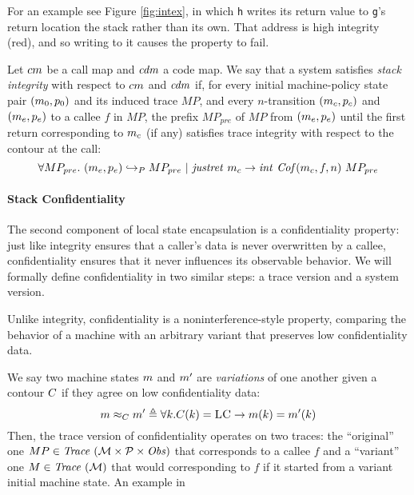 \documentclass[acmsmall,review,anonymous]{acmart}\settopmatter{printfolios=true,printccs=false,printacmref=false}
\begin{document}
For an example see Figure \ref{fig:intex}, in which {\tt h} writes its return
value to {\tt g}'s return location the stack rather than its own. That address
is high integrity (red), and so writing to it causes the property to fail.

Let $cm$ be a call map and $\mathit{cdm}$ a code map. We say that a
system satisfies {\em stack integrity} with respect to $cm$ and
$\mathit{cdm}$ if, for every initial machine-policy state pair $(m_0,
p_0)$ and its induced trace $MP$, and every $n$-transition
$(m_c, p_c)$ and $(m_e, p_e)$ to a callee $f$ in $MP$,
the prefix $MP_{pre}$ of $MP$ from $(m_e, p_e)$ until the first
return corresponding to $m_c$ (if any) satisfies trace integrity
with respect to the contour at the call:
%
$$\forall MP_{pre}. ~ (m_e,p_e) \hookrightarrow_P
MP_{pre} ~ | ~ \mathit{justret}\ m_c \rightarrow
\mathit{int}~\mathit{Cof}(m_c, f, n)~MP_{pre}$$

\paragraph*{Stack Confidentiality}

The second component of local state encapsulation is a confidentiality
property: just like integrity ensures that a caller's data is never
overwritten by a callee, confidentiality ensures that it never
influences its observable behavior. We will formally define
confidentiality in two similar steps: a trace version and a system
version.

Unlike integrity, confidentiality is a noninterference-style property,
comparing the behavior of a machine with an arbitrary variant that
preserves low confidentiality data.

We say two machine states $m$ and $m'$ are {\em variations} of one
another given a contour $C$ if they agree on low
confidentiality data:
%
\[
m \approx_C m' \triangleq \forall k .
C(k) = \textsc{LC} \rightarrow m(k) =
m'(k)
\]
%
Then, the trace version of confidentiality operates on two traces: the
``original'' one $MP \in \mathit{Trace}~({\mathcal M} \times \mathcal{P} \times \mathit{Obs})$ that corresponds to a callee $f$
and a ``variant'' one $M \in \mathit{Trace}~({\mathcal M})$ that would corresponding to $f$
if it started from a variant initial machine state. An example in
\end{document}
